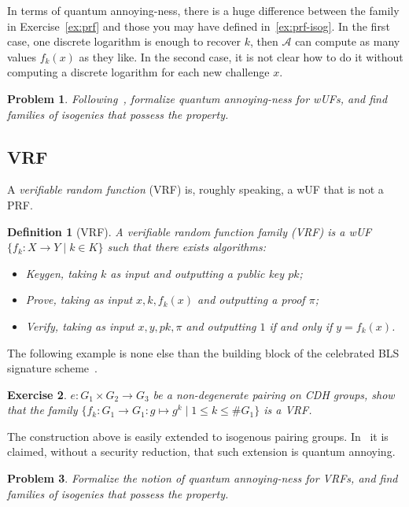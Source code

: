 \documentclass{article}
\newtheorem{ex}{Exercise}
\newtheorem{prob}[ex]{Problem}
\newtheorem{defi}{Definition}
\begin{document}
In terms of quantum annoying-ness, there is a huge difference between
the family in Exercise~\ref{ex:prf} and those you may have defined
in~\ref{ex:prf-isog}.  In the first case, one discrete logarithm is
enough to recover $k$, then $\mathcal{A}$ can compute as many values
$f_k(x)$ as they like.  In the second case, it is not clear how to do
it without computing a discrete logarithm for each new challenge $x$.

\begin{prob}
  Following~\cite{cryptoeprint:2021:696}, formalize quantum
  annoying-ness for wUFs, and find families of isogenies that possess
  the property.
\end{prob}


\subsection{VRF}

A \emph{verifiable random function} (VRF) is, roughly speaking, a wUF
that is not a PRF.

\begin{defi}[VRF]
  A \emph{verifiable random function family} (VRF) is a wUF
  $\{f_k: X\to Y \;|\; k\in K\}$ such that there exists algorithms:
  \begin{itemize}
  \item Keygen, taking $k$ as input and outputting a public key $pk$;
  \item Prove, taking as input $x, k, f_k(x)$ and outputting a proof
    $\pi$;
  \item Verify, taking as input $x, y, pk, \pi$ and outputting $1$ if
    and only if $y=f_k(x)$.
  \end{itemize}
\end{defi}

The following example is none else than the building block of the
celebrated BLS signature scheme~\cite{AC:BonLynSha01}.

\begin{ex}
  \label{ex:vrf}
  $e:G_1\times G_2\to G_3$ be a non-degenerate pairing on CDH groups,
  show that the family
  $\{f_k : G_1 \to G_1 : g\mapsto g^k \;|\; 1\le k\le \#G_1 \}$ is a
  VRF.
\end{ex}

The construction above is easily extended to isogenous pairing groups.
In~\cite{AC:DMPS19} it is claimed, without a security reduction, that
such extension is quantum annoying.

\begin{prob}
  Formalize the notion of quantum annoying-ness for VRFs, and find
  families of isogenies that possess the property.
\end{prob}
\end{document}
